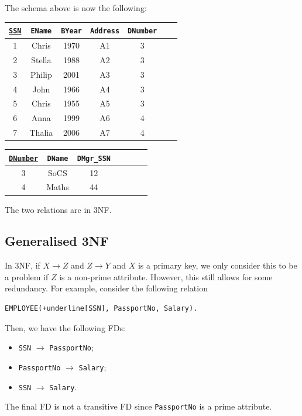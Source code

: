 \documentclass[a4paper, openany]{memoir}
\begin{document}
The schema above is now the following:
\begin{table}[H]
    \centering
    \begin{tabular}{|c|c|c|c|c|c|c|}
        \hline
        \texttt{\underline{SSN}} & \texttt{EName} & \texttt{BYear} & \texttt{Address} & \texttt{DNumber} \\
        \hline
        1 & Chris & 1970 & A1 & 3 \\
        2 & Stella & 1988 & A2 & 3 \\
        3 & Philip & 2001 & A3 & 3 \\
        4 & John & 1966 & A4 & 3 \\
        5 & Chris & 1955 & A5 & 3 \\
        6 & Anna & 1999 & A6 & 4 \\
        7 & Thalia & 2006 & A7 & 4 \\
        \hline
    \end{tabular}
\end{table}
\begin{table}[H]
    \centering
    \begin{tabular}{|c|c|c|c|c|c|c|}
        \hline
        \texttt{\underline{DNumber}} & \texttt{DName} & \texttt{DMgr\_SSN} \\
        \hline
        3 & SoCS & 12 \\
        4 & Maths & 44 \\
        \hline
    \end{tabular}
\end{table}
\noindent The two relations are in 3NF.

\subsection{Generalised 3NF}
In 3NF, if $X \to Z$ and $Z \to Y$ and $X$ is a primary key, we only consider this to be a problem if $Z$ is a non-prime attribute. However, this still allows for some redundancy. For example, consider the following relation
\begin{Verbatim}[commandchars=+\[\]]
EMPLOYEE(+underline[SSN], PassportNo, Salary).
\end{Verbatim}
Then, we have the following FDs:
\begin{itemize}
    \item \texttt{SSN} $\to$ \texttt{PassportNo};
    \item \texttt{PassportNo} $\to$ \texttt{Salary};
    \item \texttt{SSN} $\to$ \texttt{Salary}.
\end{itemize}
The final FD is not a transitive FD since \texttt{PassportNo} is a prime attribute.
\end{document}
